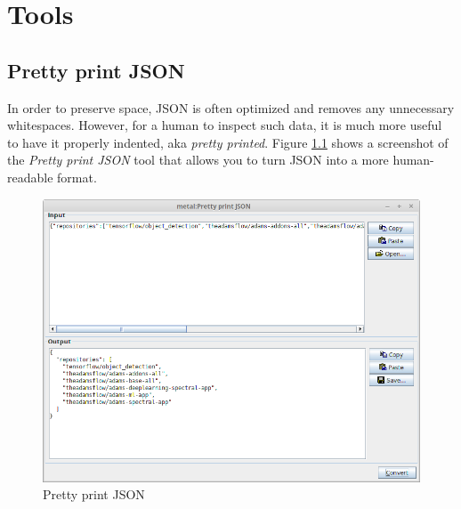 \documentclass[a4paper]{book}
\begin{document}
\chapter{Tools}

\section{Pretty print JSON}
In order to preserve space, JSON is often optimized and removes any unnecessary
whitespaces. However, for a human to inspect such data, it is much more useful
to have it properly indented, aka \textit{pretty printed}. Figure \ref{pretty_print_json}
shows a screenshot of the \textit{Pretty print JSON} tool that allows you to
turn JSON into a more human-readable format.
\begin{figure}[htb]
  \centering
  \includegraphics[width=12.0cm]{images/pretty_print_json.png}
  \caption{Pretty print JSON}
  \label{pretty_print_json}
\end{figure}



\end{document}
